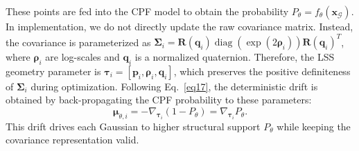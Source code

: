 \documentclass[lettersize,journal]{IEEEtran}
\begin{document}
These points are fed into the CPF model to obtain the probability $P_{\theta}=f_{\theta}(\mathbf{x}_{\mathcal{G}})$. 
In implementation, we do not directly update the raw covariance matrix. Instead, the covariance is parameterized as $\mathbf{\Sigma}_i=\mathbf{R}(\mathbf{q}_i)\operatorname{diag}(\exp(2\boldsymbol{\rho}_i))\mathbf{R}(\mathbf{q}_i)^{T}$, where $\boldsymbol{\rho}_i$ are log-scales and $\mathbf{q}_i$ is a normalized quaternion. Therefore, the LSS geometry parameter is $\boldsymbol{\tau}_i=[\mathbf{p}_i,\boldsymbol{\rho}_i,\mathbf{q}_i]$, which preserves the positive definiteness of $\mathbf{\Sigma}_i$ during optimization. Following Eq.~\ref{eq17}, the deterministic drift is obtained by back-propagating the CPF probability to these parameters:
\begin{equation}
    \boldsymbol{\mu}_{\theta,i}= -\nabla_{\boldsymbol{\tau}_i}(1-P_{\theta})=\nabla_{\boldsymbol{\tau}_i}P_{\theta}.
    \label{eq24}
\end{equation}
This drift drives each Gaussian to higher structural support $P_{\theta}$ while keeping the covariance representation valid.
\end{document}
